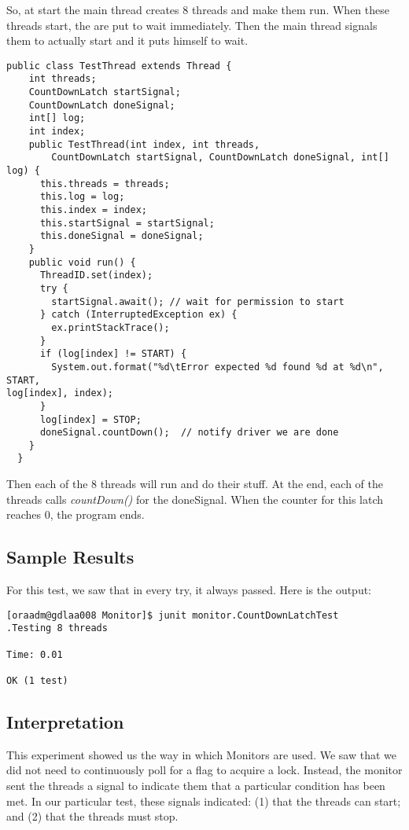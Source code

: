 \hfill
\par
So, at start the main thread creates 8 threads and make them run. When these
threads start, the are put to wait immediately. Then the main thread signals
them to actually start and it puts himself to wait.
\par
\hfill
\begin{lstlisting}[style=numbers]
  public class TestThread extends Thread {
    int threads;
    CountDownLatch startSignal;
    CountDownLatch doneSignal;
    int[] log;
    int index;
    public TestThread(int index, int threads,
        CountDownLatch startSignal, CountDownLatch doneSignal, int[] log) {
      this.threads = threads;
      this.log = log;
      this.index = index;
      this.startSignal = startSignal;
      this.doneSignal = doneSignal;
    }
    public void run() {
      ThreadID.set(index);
      try {
        startSignal.await(); // wait for permission to start
      } catch (InterruptedException ex) {
        ex.printStackTrace();
      }
      if (log[index] != START) {
        System.out.format("%d\tError expected %d found %d at %d\n", START,
log[index], index);
      }
      log[index] = STOP;
      doneSignal.countDown();  // notify driver we are done
    }
  }
\end{lstlisting}
\hfill
\par
Then each of the 8 threads will run and do their stuff. At the end, each of  the
threads calls \textit{countDown()} for the doneSignal. When the counter for this
latch reaches 0, the program ends.
\par
\subsection{Sample Results}
\par
For this test, we saw that in every try, it always passed. Here is the output:
\par
\begin{verbatim}
[oraadm@gdlaa008 Monitor]$ junit monitor.CountDownLatchTest
.Testing 8 threads

Time: 0.01

OK (1 test)
\end{verbatim}
\par
\subsection{Interpretation}
This experiment showed us the way in which Monitors are used. We saw that we did
not need to continuously poll for a flag to acquire a lock. Instead, the monitor
sent the threads a signal to indicate them that a particular condition has been
met. In our particular test, these signals indicated: (1) that the threads can
start; and (2) that the threads must stop.

